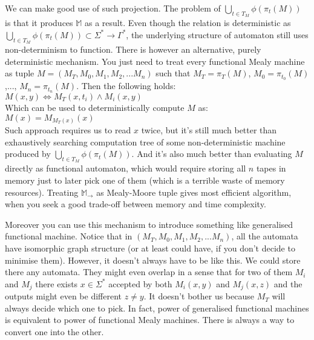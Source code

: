\documentclass[12pt]{article}
\begin{document}
We can make good use of such projection. The problem of  $\bigcup_{t\in T_M} \phi(\pi_t(M))$ is that it produces $\mathbb{M}$ as a result. Even though the relation is deterministic as $\bigcup_{t\in T_M} \phi(\pi_t(M)) \subset \Sigma^* \rightarrow \Gamma^*$, the underlying structure of automaton still uses non-determinism to function. There is however an alternative, purely deterministic mechanism. You just need to treat every functional Mealy machine as tuple $M = (M_T,M_0,M_1,M_2,...M_n)$ such that $M_T = \pi_T(M)$, $M_0 = \pi_{t_0}(M)$ ,..., $M_n = \pi_{t_n}(M)$. Then the following holds: \\
$M(x,y) \iff M_T(x,t_i) \wedge M_i(x,y)$ \\
Which can be used to deterministically compute $M$ as: \\
$M(x) = M_{M_T(x)}(x)$ \\
Such approach requires us to read $x$ twice, but it's still much better than exhaustively searching computation tree of some non-deterministic machine produced by $\bigcup_{t\in T_M} \phi(\pi_t(M))$. And it's also much better than evaluating $M$ directly as functional automaton, which would require storing all $n$ tapes in memory just to later pick one of them (which is a terrible waste of memory resources). Treating $\mathbb{M}_\rightarrow$ as Mealy-Moore tuple gives most efficient algorithm, when you seek a good trade-off between memory and time complexity.

Moreover you can use this mechanism to introduce something like generalised functional machine. Notice that in $(M_T,M_0,M_1,M_2,...M_n)$, all the automata have isomorphic graph structure (or at least could have, if you don't decide to minimise them). However, it doesn't always have to be like this. We could store there any automata. They might even overlap in a sense that for two of them $M_i$ and $M_j$ there exists $x\in\Sigma^*$ accepted by both $M_i(x,y)$ and $M_j(x,z)$ and the outputs might even be different $z\ne y$. It doesn't bother us because $M_T$ will always decide which one to pick. In fact, power of generalised functional machines is equivalent to power of functional Mealy machines. There is always a way to convert one into the other.
 
 
\end{document}
